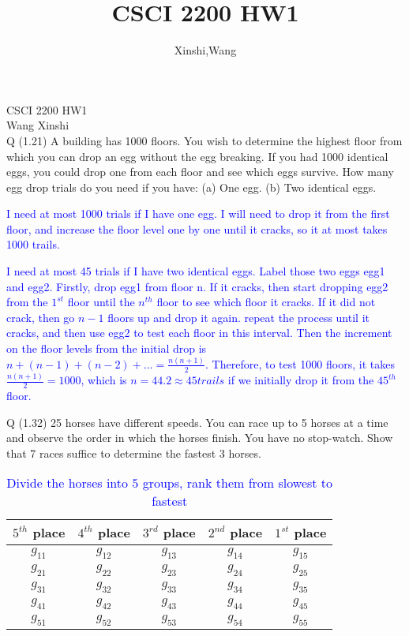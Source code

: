 \documentclass{article}
\title{CSCI 2200 HW1}
\author{Xinshi,Wang}
\begin{document}
\noindent
CSCI 2200 HW1\\
Wang Xinshi\\

\noindent Q (1.21) A building has 1000 ﬂoors. You wish to determine the highest ﬂoor from which you can drop an egg without the egg breaking. If you had 1000 identical eggs, you could drop one from each ﬂoor and see which eggs survive. How many egg drop trials do you need if you have: (a) One egg. (b) Two identical eggs.\\

\textcolor{blue}{
\begin{addmargin}[2em]{2em}
	\quad I need at most 1000 trials if I have one egg. I will need to drop it from the first floor, and increase the floor level one by one until it cracks, so it at most takes 1000 trails.
\end{addmargin}}
	
\textcolor{blue}{
	\begin{addmargin}[2em]{2em}
		\quad I need at most 45 trials if I have two identical eggs. Label those two eggs egg1 and egg2. Firstly, drop egg1 from floor n. If it cracks, then start dropping egg2 from the $1^{st}$ floor until the $n^{th}$ floor to see which floor it cracks. If it did not crack, then go $n-1$ floors up and drop it again. repeat the process until it cracks, and then use egg2 to test each floor in this interval. Then the increment on the floor levels from the initial drop is $n+(n-1)+(n-2)+... = \frac{n(n+1)}{2}.$ Therefore, to test 1000 floors, it takes $\frac{n(n+1)}{2} = 1000$, which is $n = 44.2 \approx 45 trails$ if we initially drop it from the $45^{th}$ floor. 
	\end{addmargin}}
\clearpage

\noindent Q (1.32) 25 horses have diﬀerent speeds. You can race up to 5 horses at a time and observe the order in which the horses ﬁnish. You have no stop-watch. Show that 7 races suﬃce to determine the fastest 3 horses.

\begin{table}[h]
	\center
	\caption{\textcolor{blue}{Divide the horses into $5$ groups, rank them from slowest to fastest}}
	\textcolor{blue}{
	\begin{tabular}{| c | c | c | c | c |}
		\hline
		$5^{th}$ place & $4^{th}$  place & $3^{rd}$  place & $2^{nd}$  place & $1^{st}$  place\\ 
		\hline
		$g_{11}$&$g_{12}$&$g_{13}$&$g_{14}$&$g_{15}$\\
		\hline
		$g_{21}$&$g_{22}$&$g_{23}$&$g_{24}$&$g_{25}$\\
		\hline
		$g_{31}$&$g_{32}$&$g_{33}$&$g_{34}$&$g_{35}$\\
		\hline
		$g_{41}$&$g_{42}$&$g_{43}$&$g_{44}$&$g_{45}$\\
		\hline
		$g_{51}$&$g_{52}$&$g_{53}$&$g_{54}$&$g_{55}$\\
		\hline
	\end{tabular}}
\end{table}
\end{document}
